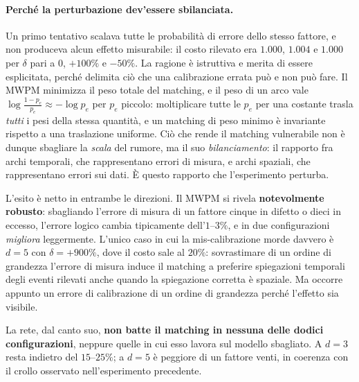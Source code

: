 \begin{samepage}
\paragraph{Perché la perturbazione dev'essere sbilanciata.} Un primo tentativo scalava tutte le probabilità di errore dello stesso fattore, e non produceva alcun effetto misurabile: il costo rilevato era $1.000$, $1.004$ e $1.000$ per $\delta$ pari a $0$, $+100\%$ e $-50\%$. La ragione è istruttiva e merita di essere esplicitata, perché delimita ciò che una calibrazione errata può e non può fare. Il \ac{MWPM} minimizza il peso totale del matching, e il peso di un arco vale $\log\frac{1-p_e}{p_e} \approx -\log p_e$ per $p_e$ piccolo: moltiplicare tutte le $p_e$ per una costante trasla \emph{tutti} i pesi della stessa quantità, e un matching di peso minimo è invariante rispetto a una traslazione uniforme. Ciò che rende il matching vulnerabile non è dunque sbagliare la \emph{scala} del rumore, ma il suo \emph{bilanciamento}: il rapporto fra archi temporali, che rappresentano errori di misura, e archi spaziali, che rappresentano errori sui dati. È questo rapporto che l'esperimento perturba.
\end{samepage}



L'esito è netto in entrambe le direzioni. Il \ac{MWPM} si rivela \textbf{notevolmente robusto}: sbagliando l'errore di misura di un fattore cinque in difetto o dieci in eccesso, l'errore logico cambia tipicamente dell'$1$--$3\%$, e in due configurazioni \emph{migliora} leggermente. L'unico caso in cui la mis-calibrazione morde davvero è $d=5$ con $\delta = +900\%$, dove il costo sale al $20\%$: sovrastimare di un ordine di grandezza l'errore di misura induce il matching a preferire spiegazioni temporali degli eventi rilevati anche quando la spiegazione corretta è spaziale. Ma occorre appunto un errore di calibrazione di un ordine di grandezza perché l'effetto sia visibile.

La rete, dal canto suo, \textbf{non batte il matching in nessuna delle dodici configurazioni}, neppure quelle in cui esso lavora sul modello sbagliato. A $d=3$ resta indietro del $15$--$25\%$; a $d=5$ è peggiore di un fattore venti, in coerenza con il crollo osservato nell'esperimento precedente.

